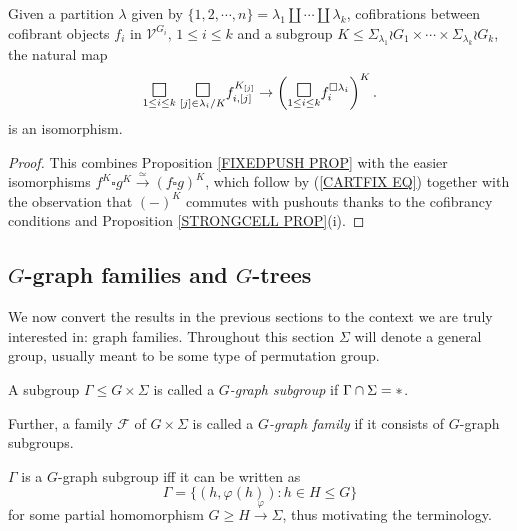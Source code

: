 \documentclass[a4paper,10pt]{article}%
\begin{document}
\begin{corollary}\label{FIXEDPUSH COR}
	Given a partition $\lambda$ given by
	$\{1,2,\cdots,n\} = \lambda_1 \amalg \cdots \amalg \lambda_k$, cofibrations between cofibrant objects $f_i$ in $\mathcal{V}^{G_i}$, $1\leq i \leq k$ and a subgroup
	$K \leq 
	\Sigma_{\lambda_1} \wr G_1
	\times \cdots \times
	\Sigma_{\lambda_k} \wr G_k
	$,
	the natural map
\[
	\underset{1\leq i\leq k}{\mathlarger{\mathlarger{\square}}}
	\phantom{|}
	\underset{[j] \in \lambda_i/K}{\mathlarger{\mathlarger{\square}}}
	f_{i, [j]}^{K_{[j]}}
\to
	\left( 	\underset{1\leq i\leq k}{\mathlarger{\mathlarger{\square}}}f_i^{\square \lambda_i} \right)^K.
\]
is an isomorphism.
\end{corollary}

\begin{proof}
This combines Proposition \ref{FIXEDPUSH PROP}
with the easier isomorphisms
$f^K \square g^K \xrightarrow{\simeq} 
(f \square g)^K$,
which follow by (\ref{CARTFIX EQ})
together with the observation that $(\minus)^K$
commutes with pushouts thanks to the cofibrancy conditions and Proposition \ref{STRONGCELL PROP}(i).
\end{proof}



\subsection{$G$-graph families and $G$-trees}
\label{G_GRAPH_SECTION}


We now convert the results in the previous sections to the context we are truly interested in:
graph families. 
Throughout this section $\Sigma$ will denote a general group,
usually meant to be some type of permutation group.


\begin{definition}
        \label{GRAPH DEF}
A subgroup $\Gamma \leq G \times \Sigma$ is called a
\textit{$G$-graph subgroup} if $\Gamma \cap \Sigma = \**$. 

Further, a family $\mathcal{F}$ of $G \times \Sigma$ is called a \textit{$G$-graph family} if it consists of $G$-graph subgroups.
\end{definition}

\begin{remark}\label{GRAPH REM}
$\Gamma$ is a $G$-graph subgroup iff it can be written as
\[
	\Gamma = 
	\{
	(h,\varphi(h)) : h \in H \leq G
	\}
\]
for some partial homomorphism $G \geq H \xrightarrow{\varphi} \Sigma$, thus motivating the terminology.
\end{remark}
\end{document}
